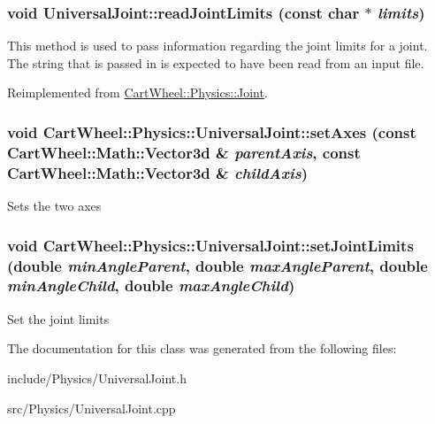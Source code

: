 \hypertarget{classCartWheel_1_1Physics_1_1UniversalJoint_a2b5b26135ffc93f34b26e1b0c35e7405}{
\subsubsection[{readJointLimits}]{\setlength{\rightskip}{0pt plus 5cm}void UniversalJoint::readJointLimits (const char $\ast$ {\em limits})}}
\label{classCartWheel_1_1Physics_1_1UniversalJoint_a2b5b26135ffc93f34b26e1b0c35e7405}
This method is used to pass information regarding the joint limits for a joint. The string that is passed in is expected to have been read from an input file. 

Reimplemented from \hyperlink{classCartWheel_1_1Physics_1_1Joint_a3a70bb2e447b5acd7997545d3751a423}{CartWheel::Physics::Joint}.

\hypertarget{classCartWheel_1_1Physics_1_1UniversalJoint_a98dbd73937ef7d9fede94f9c259388b5}{
\subsubsection[{setAxes}]{\setlength{\rightskip}{0pt plus 5cm}void CartWheel::Physics::UniversalJoint::setAxes (const {\bf CartWheel::Math::Vector3d} \& {\em parentAxis}, \/  const {\bf CartWheel::Math::Vector3d} \& {\em childAxis})}}
\label{classCartWheel_1_1Physics_1_1UniversalJoint_a98dbd73937ef7d9fede94f9c259388b5}
Sets the two axes \hypertarget{classCartWheel_1_1Physics_1_1UniversalJoint_a2df8451e6bb9357d98ace6cf7df10b6f}{
\subsubsection[{setJointLimits}]{\setlength{\rightskip}{0pt plus 5cm}void CartWheel::Physics::UniversalJoint::setJointLimits (double {\em minAngleParent}, \/  double {\em maxAngleParent}, \/  double {\em minAngleChild}, \/  double {\em maxAngleChild})}}
\label{classCartWheel_1_1Physics_1_1UniversalJoint_a2df8451e6bb9357d98ace6cf7df10b6f}
Set the joint limits 

The documentation for this class was generated from the following files:\begin{DoxyCompactItemize}
\item 
include/Physics/UniversalJoint.h\item 
src/Physics/UniversalJoint.cpp\end{DoxyCompactItemize}
